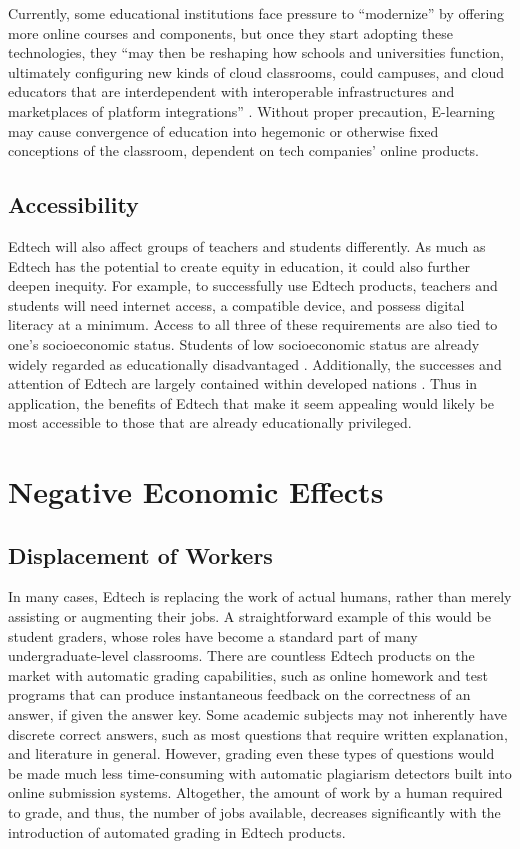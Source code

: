 \documentclass[10pt,twocolumn]{article}
\begin{document}
Currently, some educational institutions face pressure to “modernize” by offering more online courses and components, but once they start adopting these technologies, they “may then be reshaping how schools and universities function, ultimately configuring new kinds of cloud classrooms, could campuses, and cloud educators that are interdependent with interoperable infrastructures and marketplaces of platform integrations” \cite{williamson_2017}. Without proper precaution, E-learning may cause convergence of education into hegemonic or otherwise fixed conceptions of the classroom, dependent on tech companies’ online products. 
 

\subsection{Accessibility}
Edtech will also affect groups of teachers and students differently. As much as Edtech has the potential to create equity in education, it could also further deepen inequity. For example, to successfully use Edtech products, teachers and students will need internet access, a compatible device, and possess digital literacy at a minimum. Access to all three of these requirements are also tied to one’s socioeconomic status. Students of low socioeconomic status are already widely regarded as educationally disadvantaged \cite{walpole_2003}. Additionally, the successes and attention of Edtech are largely contained within developed nations \cite{bulathwela_2021}. Thus in application, the benefits of Edtech that make it seem appealing would likely be most accessible to those that are already educationally privileged.  

\section{Negative Economic Effects}
\subsection{Displacement of Workers}
In many cases, Edtech is replacing the work of actual humans, rather than merely assisting or augmenting their jobs. A straightforward example of this would be student graders, whose roles have become a standard part of many undergraduate-level classrooms. There are countless Edtech products on the market with automatic grading capabilities, such as online homework and test programs that can produce instantaneous feedback on the correctness of an answer, if given the answer key. Some academic subjects may not inherently have discrete correct answers, such as most questions that require written explanation, and literature in general. However, grading even these types of questions would be made much less time-consuming with automatic plagiarism detectors built into online submission systems. Altogether, the amount of work by a human required to grade, and thus, the number of jobs available, decreases significantly with the introduction of automated grading in Edtech products. 
\end{document}

